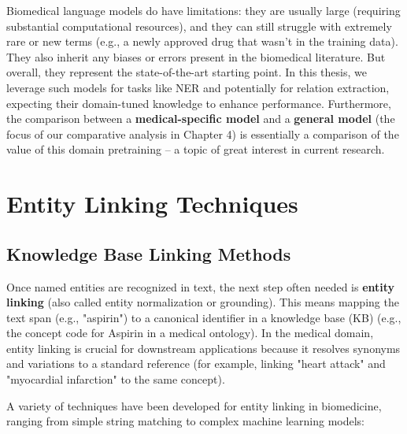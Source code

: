 Biomedical language models do have limitations: they are usually large (requiring substantial computational resources), and they can still struggle with extremely rare or new terms (e.g., a newly approved drug that wasn't in the training data). They also inherit any biases or errors present in the biomedical literature. But overall, they represent the state-of-the-art starting point. In this thesis, we leverage such models for tasks like NER and potentially for relation extraction, expecting their domain-tuned knowledge to enhance performance. Furthermore, the comparison between a \textbf{medical-specific model} and a \textbf{general model} (the focus of our comparative analysis in Chapter 4) is essentially a comparison of the value of this domain pretraining – a topic of great interest in current research.

\section{Entity Linking Techniques}

\subsection{Knowledge Base Linking Methods}

Once named entities are recognized in text, the next step often needed is \textbf{entity linking} (also called entity normalization or grounding). This means mapping the text span (e.g., "aspirin") to a canonical identifier in a knowledge base (KB) (e.g., the concept code for Aspirin in a medical ontology). In the medical domain, entity linking is crucial for downstream applications because it resolves synonyms and variations to a standard reference (for example, linking "heart attack" and "myocardial infarction" to the same concept).

A variety of techniques have been developed for entity linking in biomedicine, ranging from simple string matching to complex machine learning models:

